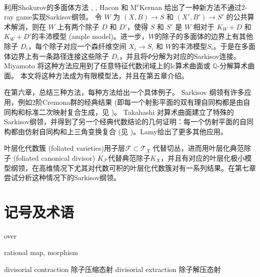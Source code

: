 利用Shokurov的多面体方法 \cite{Sho96}, \cite{cs11}, Hacon 和 M\textsuperscript{c}Kernan \cite{haconSarkisovProgram2012}给出了一种新方法不通过2-ray game实现Sarkisov纲领。
令 $W$ 为 $(X,B)\to S$ 和 $(X',B')\to S'$ 的公共算术解消，则在 $W$ 上有两个除子 $D$ 和 $D'$，使得 $S$ 和 $S'$ 是 $W$ 相对于 $K_W+D$ 和 $K_W+D'$的丰沛模型 (ample model)。进一步，$W$的除子的多面体的边界上有其他除子 $D_{i}$，每个除子对应一个森纤维空间 $X_{i}\to S_{i}$ 和 $W$的丰沛模型$S_{i}$。于是在多面体边界上有一条路径连接这些除子 $D_{i}$，并且将$\Phi$分解为对应的Sarkisov连接。
Miyamoto \cite{miyamoto2019TheSP} 将这种方法应用到了任意特征代数闭域上的lc算术曲面或 $\mathbb{Q}$-分解算术曲面。
本文将这种方法成为有限模型法，并且在第五章介绍。

在第六章，总结三种方法，每种方法给出一个具体例子。 Sarkisov 纲领有许多应用，例如2阶Cremona群的经典结果 (即每一个射影平面的双有理自同构都是由自同构和标准二次映射复合生成，见 \cite[Chapter 2]{ksc04} )。 Takahashi \cite{tak95} 对算术曲面建立了特殊的Sarkisov纲领，并得到了另一个经典代数结论的几何证明：每一个仿射平面的自同构都由仿射自同构和上三角变换复合 (见 \cite[Chpter 13]{mat02})。Lamy\cite{lam22}给出了更多其他应用。

叶层化代数簇 (foliated varieties)用子层$\mathcal{F} \subset \mathcal{T}_{X}$ 代替切丛，进而用叶层化典范除子 (foliated canonical divisor) $K_{\mathcal{F}}$代替典范除子$K_{X}$，并且有对应的叶层化极小模型纲领，在高维情况下尤其对代数可积的叶层化代数簇对有一系列结果。在第七章尝试分析这种情况下的Sarkisov纲领。



\section{记号及术语}

over 

rational map, morphism


divisorial contraction 除子压缩态射
divisorial extraction 除子解压态射

